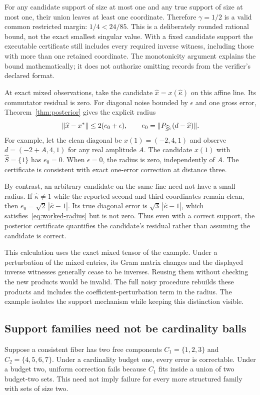 For any candidate support of size at most one and any true support of size at most one, their union leaves at least one coordinate. Therefore $\gamma=1/2$ is a valid common restricted margin: $1/4<24/85$. This is a deliberately rounded rational bound, not the exact smallest singular value. With a fixed candidate support the executable certificate still includes every required inverse witness, including those with more than one retained coordinate. The monotonicity argument explains the bound mathematically; it does not authorize omitting records from the verifier's declared format.

At exact mixed observations, take the candidate $\widehat x=x(\widehat\kappa)$ on this affine line. Its commutator residual is zero. For diagonal noise bounded by $\epsilon$ and one gross error, Theorem~\ref{thm:posterior} gives the explicit radius
\begin{equation}\label{eq:worked-radius}
 \lVert \widehat x-x^*\rVert\le 2(e_0+\epsilon),
 \qquad e_0=\lVert P_{\widehat S^c}(d-\widehat x)\rVert.
\end{equation}
For example, let the clean diagonal be $x(1)=(-2,4,1)$ and observe $d=(-2+A,4,1)$ for any real amplitude $A$. The candidate $x(1)$ with $\widehat S=\{1\}$ has $e_0=0$. When $\epsilon=0$, the radius is zero, independently of $A$. The certificate is consistent with exact one-error correction at distance three.

By contrast, an arbitrary candidate on the same line need not have a small radius. If $\widehat\kappa\ne1$ while the reported second and third coordinates remain clean, then $e_0=\sqrt2\,|\widehat\kappa-1|$. Its true diagonal error is $\sqrt3\,|\widehat\kappa-1|$, which satisfies~\eqref{eq:worked-radius} but is not zero. Thus even with a correct support, the posterior certificate quantifies the candidate's residual rather than assuming the candidate is correct.

This calculation uses the exact mixed tensor of the example. Under a perturbation of the mixed entries, its Gram matrix changes and the displayed inverse witnesses generally cease to be inverses. Reusing them without checking the new products would be invalid. The full noisy procedure rebuilds these products and includes the coefficient-perturbation term in the radius. The example isolates the support mechanism while keeping this distinction visible.

\subsection{Support families need not be cardinality balls}
Suppose a consistent fiber has two free components $C_1=\{1,2,3\}$ and $C_2=\{4,5,6,7\}$. Under a cardinality budget one, every error is correctable. Under a budget two, uniform correction fails because $C_1$ fits inside a union of two budget-two sets. This need not imply failure for every more structured family with sets of size two.

